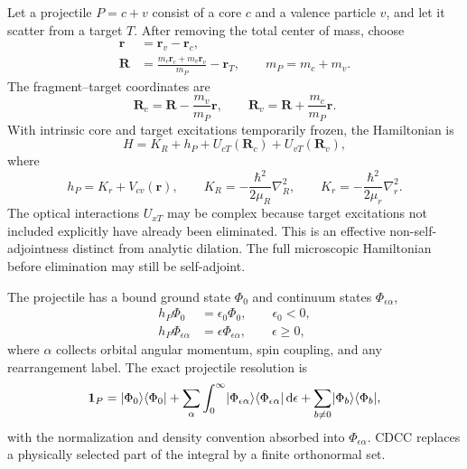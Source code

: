 Let a projectile $P=c+v$ consist of a core $c$ and a valence particle $v$,
and let it scatter from a target $T$.  After removing the total center of
mass, choose
\begin{align}
  \bm r&=\bm r_v-\bm r_c,
  \label{eq:cdcc-internal-r}\\
  \bm R&=\frac{m_c\bm r_c+m_v\bm r_v}{m_P}-\bm r_T,
  \qquad m_P=m_c+m_v .
  \label{eq:cdcc-projectile-target-R}
\end{align}
The fragment--target coordinates are
\begin{equation}
  \bm R_c=\bm R-\frac{m_v}{m_P}\bm r,
  \qquad
  \bm R_v=\bm R+\frac{m_c}{m_P}\bm r.
  \label{eq:cdcc-fragment-target-coordinates}
\end{equation}
With intrinsic core and target excitations temporarily frozen, the Hamiltonian
is
\begin{equation}
  H=K_R+h_P+U_{cT}(\bm R_c)+U_{vT}(\bm R_v),
  \label{eq:three-body-reaction-H}
\end{equation}
where
\begin{equation}
  h_P=K_r+V_{cv}(\bm r),
  \qquad
  K_R=-\frac{\hbar^2}{2\mu_R}\nabla_R^2,
  \qquad
  K_r=-\frac{\hbar^2}{2\mu_r}\nabla_r^2.
  \label{eq:projectile-internal-H}
\end{equation}
The optical interactions $U_{xT}$ may be complex because target excitations
not included explicitly have already been eliminated.  This is an effective
non-self-adjointness distinct from analytic dilation.  The full microscopic
Hamiltonian before elimination may still be self-adjoint.

The projectile has a bound ground state $\Phi_0$ and continuum states
$\Phi_{\epsilon\alpha}$,
\begin{align}
  h_P\Phi_0&=\epsilon_0\Phi_0,
  \qquad \epsilon_0<0,\\
  h_P\Phi_{\epsilon\alpha}&=\epsilon\Phi_{\epsilon\alpha},
  \qquad \epsilon\geq0,
  \label{eq:projectile-spectrum}
\end{align}
where $\alpha$ collects orbital angular momentum, spin coupling, and any
rearrangement label.  The exact projectile resolution is
\begin{equation}
  \mathbf{1}_P
  =\lvert \Phi_0 \rangle\langle \Phi_0 \rvert
   +\sum_\alpha\int_0^\infty
    \lvert \Phi_{\epsilon\alpha} \rangle
    \langle \Phi_{\epsilon\alpha} \rvert\,\mathrm{d}\epsilon
   +\sum_{b\neq0}\lvert \Phi_b \rangle\langle \Phi_b \rvert,
  \label{eq:projectile-completeness}
\end{equation}
with the normalization and density convention absorbed into
$\Phi_{\epsilon\alpha}$.  CDCC replaces a physically selected part of the
integral by a finite orthonormal set.

